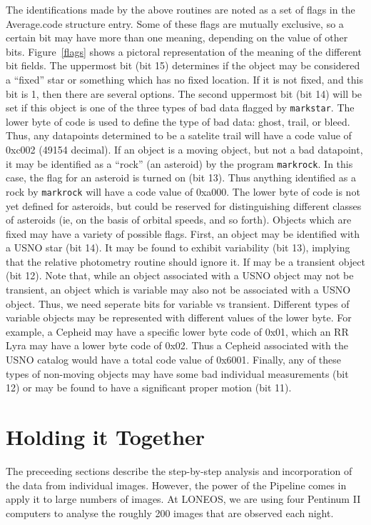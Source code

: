 \documentclass{article}
\begin{document}
The identifications made by the above routines are noted as a set of
flags in the Average.code structure entry.  Some of these flags are
mutually exclusive, so a certain bit may have more than one meaning,
depending on the value of other bits.  Figure~\ref{flags} shows a
pictoral representation of the meaning of the different bit fields.
The uppermost bit (bit 15) determines if the object may be considered
a ``fixed'' star or something which has no fixed location.  If it is
not fixed, and this bit is 1, then there are several options.  The
second uppermost bit (bit 14) will be set if this object is one of the
three types of bad data flagged by {\tt markstar}.  The lower byte of
code is used to define the type of bad data: ghost, trail, or bleed.
Thus, any datapoints determined to be a satelite trail will have a
code value of 0xc002 (49154 decimal).  If an object is a moving
object, but not a bad datapoint, it may be identified as a ``rock''
(an asteroid) by the program {\tt markrock}.  In this case, the flag
for an asteroid is turned on (bit 13).  Thus anything identified as a
rock by {\tt markrock} will have a code value of 0xa000.  The lower
byte of code is not yet defined for asteroids, but could be reserved
for distinguishing different classes of asteroids (ie, on the basis of
orbital speeds, and so forth).  Objects which are fixed may have a
variety of possible flags.  First, an object may be identified with a
USNO star (bit 14).  It may be found to exhibit variability (bit 13),
implying that the relative photometry routine should ignore it.  If
may be a transient object (bit 12).  Note that, while an object
associated with a USNO object may not be transient, an object which is
variable may also not be associated with a USNO object.  Thus, we need
seperate bits for variable vs transient.  Different types of variable
objects may be represented with different values of the lower byte.
For example, a Cepheid may have a specific lower byte code of 0x01,
which an RR Lyra may have a lower byte code of 0x02.  Thus a Cepheid
associated with the USNO catalog would have a total code value of
0x6001. Finally, any of these types of non-moving objects may have
some bad individual measurements (bit 12) or may be found to have a
significant proper motion (bit 11).

\section{Holding it Together}

The preceeding sections describe the step-by-step analysis and
incorporation of the data from individual images.  However, the power
of the Pipeline comes in apply it to large numbers of images.  At
LONEOS, we are using four Pentinum II computers to analyse the roughly 200
images that are observed each night.  
\end{document}
